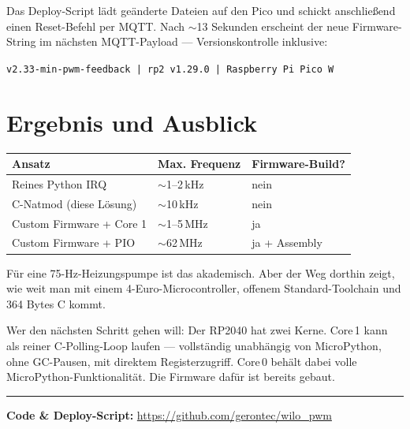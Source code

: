 \documentclass[11pt,a4paper]{article}
\begin{document}
Das Deploy-Script lädt geänderte Dateien auf den Pico und schickt
anschließend einen Reset-Befehl per MQTT.
Nach $\sim$13 Sekunden erscheint der neue Firmware-String im nächsten
MQTT-Payload --- Versionskontrolle inklusive:

\begin{center}
\texttt{v2.33-min-pwm-feedback | rp2 v1.29.0 | Raspberry Pi Pico W}
\end{center}

\section{Ergebnis und Ausblick}

\begin{center}
\begin{tabular}{lll}
\toprule
\textbf{Ansatz} & \textbf{Max. Frequenz} & \textbf{Firmware-Build?} \\
\midrule
Reines Python IRQ   & $\sim$1--2\,kHz  & nein \\
C-Natmod (diese Lösung) & $\sim$10\,kHz & nein \\
Custom Firmware + Core 1 & $\sim$1--5\,MHz & ja \\
Custom Firmware + PIO    & $\sim$62\,MHz   & ja + Assembly \\
\bottomrule
\end{tabular}
\end{center}

Für eine 75-Hz-Heizungspumpe ist das akademisch. Aber der Weg dorthin zeigt,
wie weit man mit einem 4-Euro-Microcontroller, offenem Standard-Toolchain und
364 Bytes C kommt.

Wer den nächsten Schritt gehen will: Der RP2040 hat zwei Kerne.
Core\,1 kann als reiner C-Polling-Loop laufen --- vollständig unabhängig
von MicroPython, ohne GC-Pausen, mit direktem Registerzugriff.
Core\,0 behält dabei volle MicroPython-Funktionalität.
Die Firmware dafür ist bereits gebaut.

\bigskip
\noindent\rule{\textwidth}{0.4pt}
\textbf{Code \& Deploy-Script:}
\url{https://github.com/gerontec/wilo_pwm}
\end{document}
